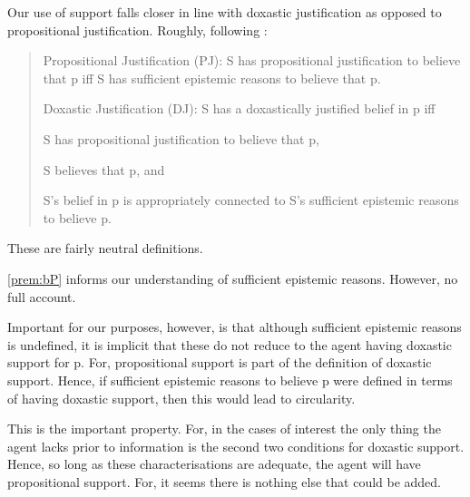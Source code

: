 \begin{note}
    Our use of support falls closer in line with doxastic justification as opposed to propositional justification.
  Roughly, following \textcite{Silva:2020aa}:

  \begin{quote}
    Propositional Justification (PJ): S has propositional justification to believe that p iff S has sufficient epistemic reasons to believe that p.

    Doxastic Justification (DJ): S has a doxastically justified belief in p iff
    \begin{enumerate*}[label=(\roman*)]
    \item S has propositional justification to believe that p,
    \item S believes that p, and
    \item S's belief in p is appropriately connected to S's sufficient epistemic reasons to believe p.
    \end{enumerate*}
  \end{quote}

  These are fairly neutral definitions.

  \ref{prem:bP} informs our understanding of sufficient epistemic reasons.
  However, no full account.

  Important for our purposes, however, is that although sufficient epistemic reasons is undefined, it is implicit that these do not reduce to the agent having doxastic support for p.
  For, propositional support is part of the definition of doxastic support.
  Hence, if sufficient epistemic reasons to believe p were defined in terms of having doxastic support, then this would lead to circularity.

  This is the important property.
  For, in the cases of interest the only thing the agent lacks prior to information is the second two conditions for doxastic support.
  Hence, so long as these characterisations are adequate, the agent will have propositional support.
  For, it seems there is nothing else that could be added.
\end{note}


